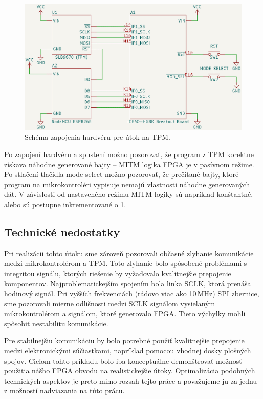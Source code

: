 \begin{figure}
    \centerline{\includegraphics[width=1\textwidth]{images/schematics/schemeTpmMitm.png}}
    \caption[Schéma zapojenia hardvéru pre útok na TPM]{Schéma zapojenia hardvéru pre útok na TPM.}
    \label{obr:schemeTpmMitm}
\end{figure}

Po zapojení hardvéru a spustení možno pozorovať, že program z TPM korektne získava náhodne generované bajty -- MITM logika FPGA je v pasívnom režime. Po stlačení tlačidla mode select možno pozorovať, že prečítané  bajty, ktoré program na mikrokontroléri vypisuje nemajú vlastnosti náhodne generovaných dát. V závislosti od nastaveného režimu MITM logiky sú napríklad konštantné, alebo sú postupne inkrementované o 1.

\subsection{Technické nedostatky}
Pri realizácii tohto útoku sme zároveň pozorovali občasné zlyhanie komunikácie medzi mikrokontrolérom a TPM. Toto zlyhanie bolo spôsobené problémami s integritou signálu, ktorých riešenie by vyžadovalo kvalitnejšie prepojenie komponentov. Najproblematickejším spojením bola linka SCLK, ktorá prenáša hodinový signál. Pri vyšších frekvenciách (rádovo viac ako 10\,MHz) SPI zbernice, sme pozorovali mierne odlišnosti medzi SCLK signálom vysielaným mikrokontrolérom a signálom, ktoré generovalo FPGA. Tieto výchylky mohli spôsobiť nestabilitu komunikácie. 

Pre stabilnejšiu komunikáciu by bolo potrebné použiť kvalitnejšie prepojenie medzi elektronickými súčiastkami, napríklad pomocou vhodnej dosky plošných spojov. Cieľom tohto príkladu bolo iba konceptuálne demonštrovať možnosť použitia nášho FPGA obvodu na realistickejšie útoky. Optimalizácia podobných technických aspektov je preto mimo rozsah tejto práce a považujeme ju za jednu z možností nadviazania na túto prácu.